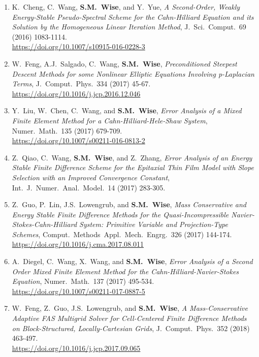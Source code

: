 \documentclass[11pt]{letter}
\begin{document}
\begin{enumerate}
	\item
K.~Cheng, C.~Wang, \textbf{S.M.~Wise}, and Y.~Yue, {\sl A Second-Order, Weakly Energy-Stable Pseudo-Spectral Scheme for the Cahn-Hilliard Equation and its Solution by the Homogeneous Linear Iteration Method}, J.~Sci.~Comput.~69 (2016) 1083-1114.
	\\ 
\url{https://doi.org/10.1007/s10915-016-0228-3}

	\item
W.~Feng, A.J.~Salgado, C.~Wang, \textbf{S.M.~Wise}, {\sl Preconditioned Steepest Descent Methods for some Nonlinear Elliptic Equations Involving p-Laplacian Terms}, J.~Comput.~Phys.~334 (2017) 45-67.
	\\ 
\url{https://doi.org/10.1016/j.jcp.2016.12.046}

	\item
Y.~Liu, W.~Chen, C.~Wang, and \textbf{S.M.~Wise}, {\sl Error Analysis of a Mixed Finite Element Method for a Cahn-Hilliard-Hele-Shaw System}, Numer.~Math.~135 (2017) 679-709.
	\\ 
\url{https://doi.org/10.1007/s00211-016-0813-2}

	\item
Z.~Qiao, C.~Wang, \textbf{S.M.~Wise}, and Z.~Zhang, {\sl Error Analysis of an Energy Stable Finite Difference Scheme for the Epitaxial Thin Film Model with Slope Selection with an Improved Convergence Constant}, Int.~J.~Numer.~Anal.~Model.~14 (2017) 283-305.

	\item
Z.~Guo, P.~Lin, J.S.~Lowengrub, and \textbf{S.M.~Wise}, {\sl Mass Conservative and Energy Stable Finite Difference Methods for the Quasi-Incompressible Navier-Stokes-Cahn-Hilliard System: Primitive Variable and Projection-Type Schemes}, Comput.~Methods~Appl.~Mech.~Engrg.~326 (2017) 144-174.
	\\ 
\url{https://doi.org/10.1016/j.cma.2017.08.011}

	\item
A.~Diegel, C.~Wang, X.~Wang, and \textbf{S.M.~Wise}, {\sl Error Analysis of a Second Order Mixed Finite Element Method for the Cahn-Hilliard-Navier-Stokes Equation}, Numer.~Math.~137 (2017) 495-534.
	\\ 
\url{https://doi.org/10.1007/s00211-017-0887-5}

	\item
W.~Feng, Z.~Guo, J.S.~Lowengrub, and \textbf{S.M.~Wise}, {\sl A Mass-Conservative Adaptive FAS Multigrid Solver for Cell-Centered Finite Difference Methods on Block-Structured, Locally-Cartesian Grids}, J.~Comput.~Phys.~352 (2018) 463-497.
	\\ 
\url{https://doi.org/10.1016/j.jcp.2017.09.065}


\end{enumerate}
\end{document}
